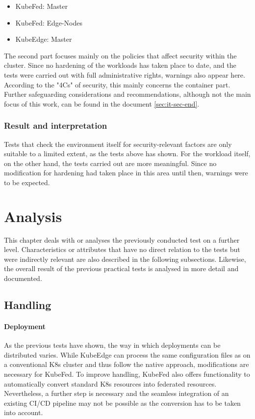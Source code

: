 \documentclass[MSC,Master,english]{twbook}%
\begin{document}
\begin{itemize}
    \itemsep0em
    \item KubeFed: Master
    \item KubeFed: Edge-Nodes
    \item KubeEdge: Master 
\end{itemize}



\par
The second part focuses mainly on the policies that affect security within the cluster. Since no hardening of the workloads has taken place to date, and the tests were carried out with full administrative rights, warnings also appear here. According to the "4Cs" of security, this mainly concerns the container part. Further safeguarding considerations and recommendations, although not the main focus of this work, can be found in the document \autoref{sec:it-sec-end}.

\subsubsection{Result and interpretation} Tests that check the environment itself for security-relevant factors are only suitable to a limited extent, as the tests above has shown. For the workload itself, on the other hand, the tests carried out are more meaningful. Since no modification for hardening had taken place in this area until then, warnings were to be expected.

\section{Analysis}
\label{sec:dsranalysis}
This chapter deals with or analyses the previously conducted test on a further level. Characteristics or attributes that have no direct relation to the tests but were indirectly relevant are also described  in the following subsections. Likewise, the overall result of the previous practical tests is analysed in more detail and documented.

\subsection{Handling}
\label{sec:handling}
\paragraph{Deployment} As the previous tests have shown, the way in which deployments can be distributed varies. While KubeEdge can process the same configuration files as on a conventional \ac{K8s} cluster and thus follow the native approach, modifications are necessary for KubeFed. To improve handling, KubeFed also offers functionality to automatically convert standard \ac{K8s} resources into federated resources. Nevertheless, a further step is necessary and the seamless integration of an existing CI/CD pipeline may not be possible as the conversion has to be taken into account.
\end{document}
